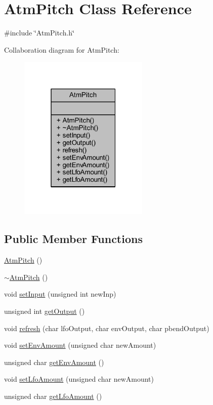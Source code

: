 \hypertarget{class_atm_pitch}{}\section{Atm\+Pitch Class Reference}
\label{class_atm_pitch}


{\ttfamily \#include \char`\"{}Atm\+Pitch.\+h\char`\"{}}



Collaboration diagram for Atm\+Pitch\+:
\nopagebreak
\begin{figure}[H]
\begin{center}
\leavevmode
\includegraphics[width=175pt]{de/d96/class_atm_pitch__coll__graph}
\end{center}
\end{figure}
\subsection*{Public Member Functions}
\begin{DoxyCompactItemize}
\item 
\hyperlink{class_atm_pitch_a02c102d3f93af7a44230dad9c23f4023}{Atm\+Pitch} ()
\item 
\hyperlink{class_atm_pitch_aaefa1f3952ff8c8c6b8cf0ed99cc1fa7}{$\sim$\+Atm\+Pitch} ()
\item 
void \hyperlink{class_atm_pitch_a5e7f1f2581cc25bb966fdfe0c945923d}{set\+Input} (unsigned int new\+Inp)
\item 
unsigned int \hyperlink{class_atm_pitch_a30b8bb597d3f1ce75a0394d2dd510004}{get\+Output} ()
\item 
void \hyperlink{class_atm_pitch_a2fc4d9ea4f73818022f9512a656b9572}{refresh} (char lfo\+Output, char env\+Output, char pbend\+Output)
\item 
void \hyperlink{class_atm_pitch_a6e1cbd180ffd94db37eceb4fe95b039b}{set\+Env\+Amount} (unsigned char new\+Amount)
\item 
unsigned char \hyperlink{class_atm_pitch_a850e1e507b70bc3a12049d48cd65283f}{get\+Env\+Amount} ()
\item 
void \hyperlink{class_atm_pitch_a4d4617a54ac352f240b72f3b2194b6c7}{set\+Lfo\+Amount} (unsigned char new\+Amount)
\item 
unsigned char \hyperlink{class_atm_pitch_ace9d80c3de42d8e0920e6d23cf753dcc}{get\+Lfo\+Amount} ()
\end{DoxyCompactItemize}


